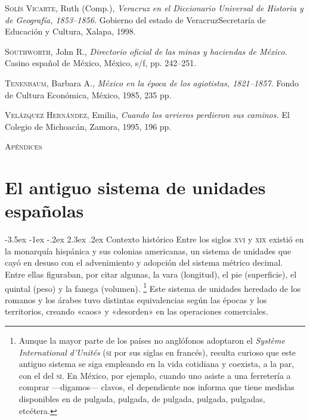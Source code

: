 \documentclass[14pt,twoside,final]{extbook} %
\makeatletter
\let\oldfootnote\footnote
\renewcommand\footnote[1]{%
\oldfootnote{\hspace{1mm}#1}}
\renewcommand\section{\@startsection {section}{1}{\z@}%
                                     {-3.5ex \@plus -1ex \@minus -.2ex}%
                                     {2.3ex \@plus .2ex}%
                                     {\normalfont\large\bfseries\sc}}
\providecommand\phantomsection{} %
\makeatother
\begin{document}
\textsc{Solís Vicarte}, Ruth (Comp.), \emph{Veracruz en el Diccionario Universal de Historia y de Geografía, 1853--1856.} Gobierno del estado de Veracruz Secretaría de Educación y Cultura, Xalapa, 1998.

\textsc{Southworth}, John R., \emph{Directorio oficial de las minas y haciendas de México.} Casino español de México, México, s/f, pp. 242--251.

\textsc{Tenenbaum}, Barbara A., \emph{México en la época de los agiotistas, 1821--1857.} Fondo de Cultura Económica, México, 1985, 235 pp.

\textsc{Velázquez Hernández}, Emilia, \emph{Cuando los arrieros perdieron sus caminos.} El Colegio de Michoacán, Zamora, 1995, 196 pp.
\cleardoublepage
\newpage
\pagestyle{empty}
\hspace*{0pt}
\protect\phantomsection
\vfill
\begin{center}
\Huge\scshape Apéndices
\end{center}
\vfill
\appendix
\chapter{El antiguo sistema de unidades españolas}
\label{ap:antiguo-sistema-unidades-españolas}
\thispagestyle{empty}
\pagestyle{fancy}
\fancyhf{} %
\fancyhead[RO,LE]{\thepage}
\renewcommand{\headrulewidth}{0pt}
\section{Contexto histórico}
Entre los siglos \textsc{xvi} y \textsc{xix} existió en la monarquía hispánica y sus colonias americanas, un sistema de unidades que cayó en desuso con el advenimiento y adopción del sistema métrico decimal. Entre ellas figuraban, por citar algunas, la vara (longitud), el pie (superficie), el quintal (peso) y la fanega (volumen).\footnote{Aunque la mayor parte de los países no anglófonos adoptaron el \emph{Système International d'\/Unités} (\textsc{si} por sus siglas en francés), resulta curioso que este antiguo sistema se siga empleando en la vida cotidiana y coexista, a la par, con el del \textsc{si}. En México, por ejemplo, cuando uno asiste a una ferretería a comprar ---digamos--- clavos, el dependiente nos informa que tiene medidas disponibles en \textfrac{1}{4} de pulgada, \textfrac{1}{2} pulgada, \textfrac{3}{4} de pulgada, \textlf{1} pulgada, \textfrac[2]{1}{2} pulgadas, etcétera.} Este sistema de unidades heredado de los romanos y los árabes tuvo distintas equivalencias según las épocas y los territorios, creando «caos» y «desorden» en las operaciones comerciales.
\end{document}
